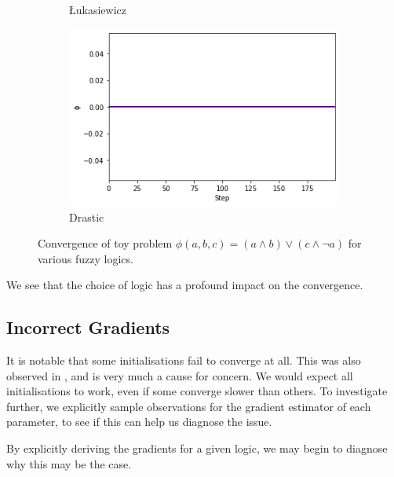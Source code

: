\begin{figure}[h]
\begin{subfigure}[b]{0.45\textwidth}
        \caption{Łukasiewicz}
        \label{fig:toyluk}
    \end{subfigure}
    \begin{subfigure}[b]{0.45\textwidth}
        \centering
        \includegraphics[width=\textwidth]{imgs/toyconv_dra.png}
        \caption{Drastic}
        \label{fig:toydra}
    \end{subfigure}
       \caption{Convergence of toy problem $\phi(a,b,c) = (a \land b) \lor (c \land \lnot a)$ for various fuzzy logics.}
       \label{fig:toyconv}
\end{figure}

We see that the choice of logic has a profound impact on the convergence. 

\subsection{Incorrect Gradients}

It is notable that some initialisations fail to converge at all. This was also observed in \cite{analyzefuzzy}, and is very much a cause for concern. We would expect all initialisations to work, even if some converge slower than others. To investigate further, we explicitly sample observations for the gradient estimator of each parameter, to see if this can help us diagnose the issue.



By explicitly deriving the gradients for a given logic, we may begin to diagnose why this may be the case.


